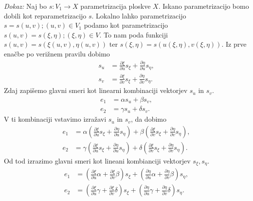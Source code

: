 \noindent
{\em Dokaz:\/}
Naj bo $s: V_1 \to  X$ parametrizacija ploskve $X$. Iskano parametrizacijo bomo dobili kot reparametrizacijo $s$.
Lokalno lahko parametrizacijo $s = s(u,v); (u,v) \in V_1$ podamo kot parametrizacijo $s(u,v) = s(\xi, \eta); (\xi, \eta) \in V$.
To nam poda funkciji $s(u,v) = s(\xi(u,v), \eta(u,v))$ ter $s(\xi, \eta) = s(u(\xi, \eta), v(\xi, \eta))$.  
Iz prve enačbe po verižnem pravilu dobimo \begin{align*}
    s_u &= \frac{ \partial \xi }{ \partial u } s_{\xi} + \frac{ \partial \eta }{ \partial u } s_{\eta},  \\
    s_v &= \frac{ \partial \xi }{ \partial v } s_{\xi} + \frac{ \partial \eta }{ \partial v } s_{\eta}.
\end{align*}
Zdaj zapišemo glavni smeri kot linearni kombinaciji vektorjev $s_u$ in $s_v$.
\begin{align*}
    e_1 &= \alpha s_u + \beta s_v, \\
    e_2 &= \gamma s_u + \delta s_v.
\end{align*}
V ti kombinaciji vstavimo izražavi $s_u$ in $s_v$, da dobimo \begin{align*}
  e_1 &= \alpha \left(\frac{ \partial \xi }{ \partial u } s_{\xi} + \frac{ \partial \eta }{ \partial u } s_{\eta}\right) + \beta \left(\frac{ \partial \xi }{ \partial v } s_{\xi} + \frac{ \partial \eta }{ \partial v } s_{\eta}\right), \\
  e_2 &= \gamma \left(\frac{ \partial \xi }{ \partial u } s_{\xi} + \frac{ \partial \eta }{ \partial u } s_{\eta}\right) + \delta \left(\frac{ \partial \xi }{ \partial v } s_{\xi} + \frac{ \partial \eta }{ \partial v } s_{\eta}\right).
\end{align*}
Od tod izrazimo glavni smeri kot lineani kombianciji vektorjev $s_{\xi}, s_{\eta}$. \begin{align*}
    e_{1} &= \left(\frac{ \partial \xi }{ \partial u } \alpha + \frac{ \partial \xi }{ \partial v } \beta \right) s_{\xi} + \left(\frac{ \partial \eta }{ \partial u } \alpha + \frac{ \partial \eta }{ \partial v } \beta \right) s_{\eta}, \\
    e_2 &= \left(\frac{ \partial \xi }{ \partial u } \gamma + \frac{ \partial \xi }{ \partial v } \delta \right) s_{\xi} + \left(\frac{ \partial \eta }{ \partial u } \gamma + \frac{ \partial \eta }{ \partial v } \delta \right) s_{\eta}.
\end{align*}

